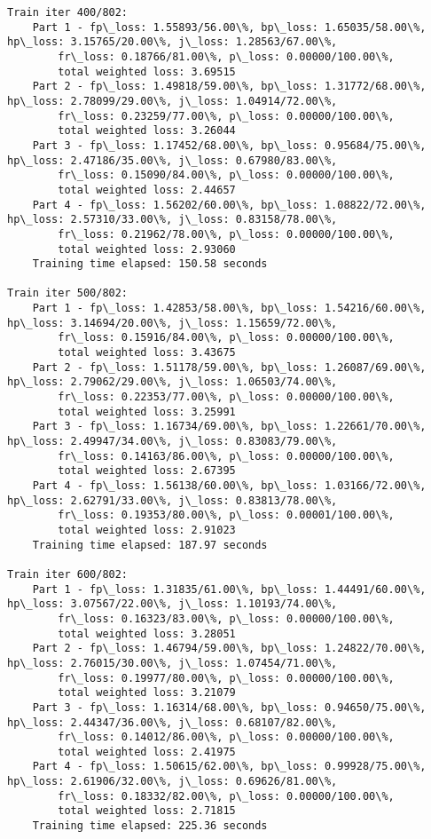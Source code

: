 \documentclass[11pt]{article}
\begin{document}
\begin{Verbatim}[commandchars=\\\{\}]
Train iter 400/802:
	Part 1 - fp\_loss: 1.55893/56.00\%, bp\_loss: 1.65035/58.00\%, hp\_loss: 3.15765/20.00\%, j\_loss: 1.28563/67.00\%, 
		fr\_loss: 0.18766/81.00\%, p\_loss: 0.00000/100.00\%, 
		total weighted loss: 3.69515
	Part 2 - fp\_loss: 1.49818/59.00\%, bp\_loss: 1.31772/68.00\%, hp\_loss: 2.78099/29.00\%, j\_loss: 1.04914/72.00\%, 
		fr\_loss: 0.23259/77.00\%, p\_loss: 0.00000/100.00\%, 
		total weighted loss: 3.26044
	Part 3 - fp\_loss: 1.17452/68.00\%, bp\_loss: 0.95684/75.00\%, hp\_loss: 2.47186/35.00\%, j\_loss: 0.67980/83.00\%, 
		fr\_loss: 0.15090/84.00\%, p\_loss: 0.00000/100.00\%, 
		total weighted loss: 2.44657
	Part 4 - fp\_loss: 1.56202/60.00\%, bp\_loss: 1.08822/72.00\%, hp\_loss: 2.57310/33.00\%, j\_loss: 0.83158/78.00\%, 
		fr\_loss: 0.21962/78.00\%, p\_loss: 0.00000/100.00\%, 
		total weighted loss: 2.93060
	Training time elapsed: 150.58 seconds

Train iter 500/802:
	Part 1 - fp\_loss: 1.42853/58.00\%, bp\_loss: 1.54216/60.00\%, hp\_loss: 3.14694/20.00\%, j\_loss: 1.15659/72.00\%, 
		fr\_loss: 0.15916/84.00\%, p\_loss: 0.00000/100.00\%, 
		total weighted loss: 3.43675
	Part 2 - fp\_loss: 1.51178/59.00\%, bp\_loss: 1.26087/69.00\%, hp\_loss: 2.79062/29.00\%, j\_loss: 1.06503/74.00\%, 
		fr\_loss: 0.22353/77.00\%, p\_loss: 0.00000/100.00\%, 
		total weighted loss: 3.25991
	Part 3 - fp\_loss: 1.16734/69.00\%, bp\_loss: 1.22661/70.00\%, hp\_loss: 2.49947/34.00\%, j\_loss: 0.83083/79.00\%, 
		fr\_loss: 0.14163/86.00\%, p\_loss: 0.00000/100.00\%, 
		total weighted loss: 2.67395
	Part 4 - fp\_loss: 1.56138/60.00\%, bp\_loss: 1.03166/72.00\%, hp\_loss: 2.62791/33.00\%, j\_loss: 0.83813/78.00\%, 
		fr\_loss: 0.19353/80.00\%, p\_loss: 0.00001/100.00\%, 
		total weighted loss: 2.91023
	Training time elapsed: 187.97 seconds

Train iter 600/802:
	Part 1 - fp\_loss: 1.31835/61.00\%, bp\_loss: 1.44491/60.00\%, hp\_loss: 3.07567/22.00\%, j\_loss: 1.10193/74.00\%, 
		fr\_loss: 0.16323/83.00\%, p\_loss: 0.00000/100.00\%, 
		total weighted loss: 3.28051
	Part 2 - fp\_loss: 1.46794/59.00\%, bp\_loss: 1.24822/70.00\%, hp\_loss: 2.76015/30.00\%, j\_loss: 1.07454/71.00\%, 
		fr\_loss: 0.19977/80.00\%, p\_loss: 0.00000/100.00\%, 
		total weighted loss: 3.21079
	Part 3 - fp\_loss: 1.16314/68.00\%, bp\_loss: 0.94650/75.00\%, hp\_loss: 2.44347/36.00\%, j\_loss: 0.68107/82.00\%, 
		fr\_loss: 0.14012/86.00\%, p\_loss: 0.00000/100.00\%, 
		total weighted loss: 2.41975
	Part 4 - fp\_loss: 1.50615/62.00\%, bp\_loss: 0.99928/75.00\%, hp\_loss: 2.61906/32.00\%, j\_loss: 0.69626/81.00\%, 
		fr\_loss: 0.18332/82.00\%, p\_loss: 0.00000/100.00\%, 
		total weighted loss: 2.71815
	Training time elapsed: 225.36 seconds


\end{Verbatim}
\end{document}
